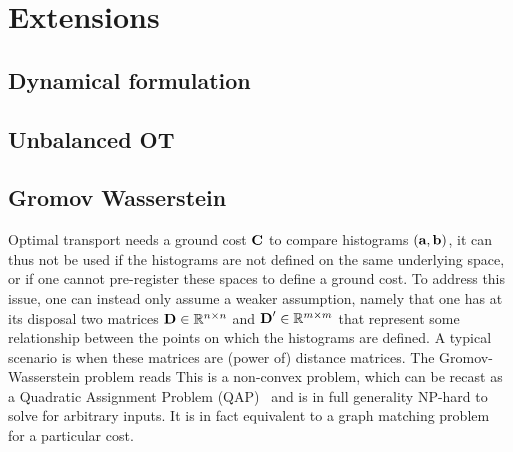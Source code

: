 
\section{Extensions}

\subsection{Dynamical formulation}

\subsection{Unbalanced OT}

\subsection{Gromov Wasserstein}


Optimal transport needs a ground cost $\mathrm{\textbf{\upshape C}}$ to compare histograms $(\mathrm{\textbf{\upshape a}},\mathrm{\textbf{\upshape b}})$, it can thus not be used if the histograms are not defined on the same underlying space, or if one cannot pre-register these spaces to define a ground cost. 
%
To address this issue, one can instead only assume a weaker assumption, namely that one has at its disposal two matrices $\mathrm{\textbf{\upshape D}} \in \mathbb{R}^{n \times n}$ and $\mathrm{\textbf{\upshape D}}' \in \mathbb{R}^{m \times m}$ that represent some relationship between the points on which the histograms are defined. A typical scenario is when these matrices are (power of) distance matrices.
%
The Gromov-Wasserstein problem reads
This is a non-convex problem, which can be recast as a Quadratic Assignment Problem (QAP)~\cite{loiola-2007} and is in full generality NP-hard to solve for arbitrary inputs. 
%
It is in fact equivalent to a graph matching problem~\cite{lyzinski-2015} for a particular cost.

